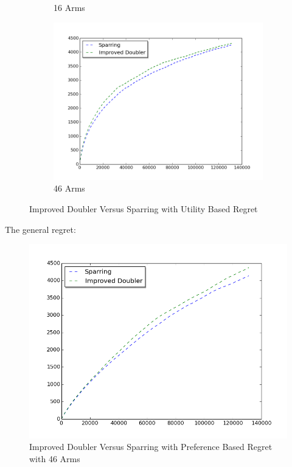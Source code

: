 \documentclass{llncs}
\begin{document}
\begin{figure}[h!]
\begin{subfigure}{.5\textwidth}
  \caption{16 Arms}
  \label{fig:sub2}
\end{subfigure}
\begin{subfigure}{.5\textwidth}
  \centering
  \includegraphics[scale=0.3, natwidth=410,natheight=442]{figures/improved_doubler_sparring_MQ2007_46arms.png}
  \caption{46 Arms}
  \label{fig:sub2}
\end{subfigure}
\caption{Improved Doubler Versus Sparring with Utility Based Regret}
\label{fig:test}
\end{figure}

The general regret:
\begin{figure}[h!]
  \centering
     \includegraphics[scale=0.3, natwidth=410,natheight=442]{figures/improved_doubler_sparring_MQ2007_general.png} 
  \caption{Improved Doubler Versus Sparring with Preference Based Regret with 46 Arms}
\end{figure}
\newpage
\end{document}
